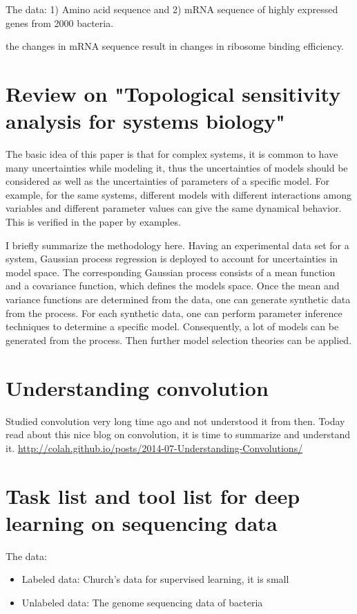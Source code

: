 \documentclass[paper=a4, fontsize=12pt]{scrartcl}	%
\numberwithin{equation}{section}					%
\numberwithin{figure}{section}					%
\numberwithin{table}{section}					%
\begin{document}
The data: 1) Amino acid sequence and 2) mRNA sequence of highly expressed genes from 2000 bacteria. 

the changes in mRNA sequence result in changes in ribosome binding efficiency. 

\section*{Review on "Topological sensitivity analysis for systems biology"}
The basic idea of this paper is that for complex systems, it is common to have many uncertainties while modeling it, thus the uncertainties of models should be considered as well as the uncertainties of parameters of a specific model. For example, for the same systems, different models with different interactions among variables and different parameter values can give the same dynamical behavior. This is verified in the paper by examples. 

I briefly summarize the methodology here. Having an experimental data set for a system, Gaussian process regression is deployed to account for uncertainties in model space. The corresponding Gaussian process consists of a mean function and a covariance function, which defines the models space. Once the mean and variance functions are determined from the data, one can generate synthetic data from the process. For each synthetic data, one can perform parameter inference techniques to determine a specific model. Consequently, a lot of models can be generated from the process. Then further model selection theories can be applied. 

\section*{Understanding convolution}
Studied convolution very long time ago and not understood it from then. Today read about this nice blog on convolution, it is time to summarize and understand it. \url{http://colah.github.io/posts/2014-07-Understanding-Convolutions/}





\section*{Task list and tool list for deep learning on sequencing data}

The data: 
\begin{itemize}
\item Labeled data: Church's data for supervised learning, it is small
\item Unlabeled data: The genome sequencing data of bacteria
\end{itemize}
\end{document}
